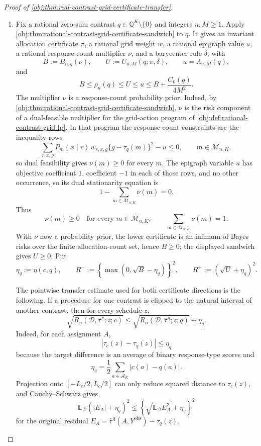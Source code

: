 \begin{proof}[Proof of \cref{obj:thm:real-contrast-grid-certificate-transfer}]
\begin{enumerate}
\item\label{it:real-contrast-finite-grid-transfer} Fix a rational zero-sum contrast \(q\in\mathbb Q^K\setminus\{0\}\) and integers \(n,M\ge 1\).  Apply \cref{obj:thm:rational-contrast-grid-certificate-sandwich} to \(q\).  It gives an invariant allocation certificate \(\pi\), a rational grid weight \(w\), a rational epigraph value \(u\), a rational response-count multiplier \(\nu\), and a barycenter rule \(\delta\), with
\[
B:=B_{n,q}(\nu),\qquad
U:=U_{n,M}(q;\pi,\delta),\qquad
u=\Lambda_{n,M}(q),
\]
and
\[
B\le \rho_n(q)\le U\le u
\le B+\frac{C_0(q)}{4M^2}.
\]
The multiplier \(\nu\) is a response-count probability prior.  Indeed, by \cref{obj:thm:rational-contrast-grid-certificate-sandwich}, \(\nu\) is the risk component of a dual-feasible multiplier for the grid-action program of \cref{obj:def:rational-contrast-grid-lp}.  In that program the response-count constraints are the inequality rows
\[
\sum_{r,x,g}P_m(x\mid r)\,w_{r,x,g}\{g-\tau_q(m)\}^2-u\le 0,
\qquad m\in\mathcal M_{n,K},
\]
so dual feasibility gives \(\nu(m)\ge0\) for every \(m\).  The epigraph variable \(u\) has objective coefficient \(1\), coefficient \(-1\) in each of those rows, and no other occurrence, so its dual stationarity equation is
\[
1-\sum_{m\in\mathcal M_{n,K}}\nu(m)=0.
\]
Thus
\[
\nu(m)\ge0\quad\text{for every }m\in\mathcal M_{n,K},
\qquad
\sum_{m\in\mathcal M_{n,K}}\nu(m)=1.
\]
With \(\nu\) now a probability prior, the lower certificate is an infimum of Bayes risks over the finite allocation-count set, hence \(B\ge0\); the displayed sandwich gives \(U\ge0\).  Put
\[
\eta_q:=\eta(c,q),\qquad
R^-:=\left\{\max(0,\sqrt B-\eta_q)\right\}^2,\qquad
R^+:=(\sqrt U+\eta_q)^2 .
\]

The pointwise transfer estimate used for both certificate directions is the following.  If a procedure for one contrast is clipped to the natural interval of another contrast, then for every schedule \(z\),
\[
\sqrt{R_n(\mathcal D,\widehat\tau^{\,c};z;c)}
\le
\sqrt{R_n(\mathcal D,\widehat\tau^{\,q};z;q)}+\eta_q .
\]
Indeed, for each assignment \(A\),
\[
|\tau_c(z)-\tau_q(z)|\le \eta_q
\]
because the target difference is an average of binary response-type scores and
\[
\eta_q=\frac12\sum_{a\in\mathcal A_K}|c(a)-q(a)|.
\]
Projection onto \([-L_c/2,L_c/2]\) can only reduce squared distance to \(\tau_c(z)\), and Cauchy--Schwarz gives
\[
\mathbb E_{\mathcal D}\!\left(|E_A|+\eta_q\right)^2
\le
\left\{\sqrt{\mathbb E_{\mathcal D}E_A^2}+\eta_q\right\}^2
\]
for the original residual \(E_A=\widehat\tau^{\,q}(A,Y^{\mathrm{obs}})-\tau_q(z)\).


\end{enumerate}
\end{proof}
